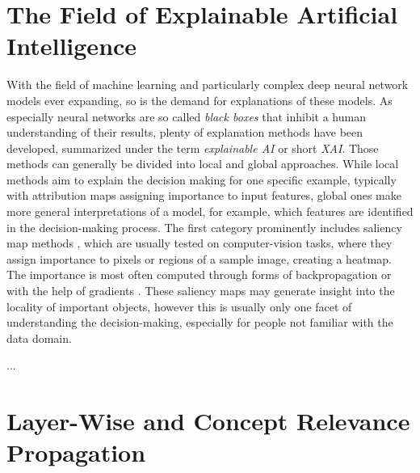 \section{The Field of Explainable Artificial Intelligence}
With the field of machine learning and particularly complex deep neural network models ever expanding, so is the demand for explanations of these models.
As especially neural networks are so called \textit{black boxes} that inhibit a human understanding of their results, plenty of explanation methods have been developed, summarized under the term \textit{explainable AI} or short \textit{XAI}.
Those methods can generally be divided into local and global approaches. While local methods aim to explain the decision making for one specific example, typically with attribution maps assigning importance to input features, global ones make more general interpretations of a model, for example, which features are identified in the decision-making process. The first category prominently includes saliency map methods , which are usually tested on computer-vision tasks, where they assign importance to pixels or regions of a sample image, creating a heatmap. The importance is most often computed through forms of backpropagation  or with the help of gradients . These saliency maps may generate insight into the locality of important objects, however this is usually only one facet of understanding the decision-making, especially for people not familiar with the data domain.

...



\section{Layer-Wise and Concept Relevance Propagation}


